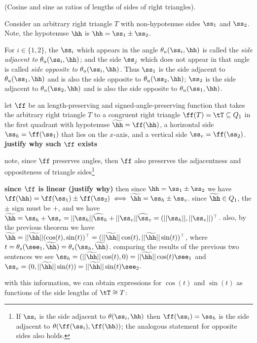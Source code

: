 \begin{deriv}
	(Cosine and sine as ratios of lengths of sides of right triangles).
	
	\newcommand{\thh}{\widetilde{\hh}}
	
	Consider an arbitrary right triangle $T$ with non-hypotenuse sides $\ss_1$ and $\ss_2$. Note, the hypotenuse $\hh$ is $\hh = \ss_1 \pm \ss_2$.
	
	For $i \in \{1, 2\}$, the $\ss_i$ which appears in the angle $\theta_u(\ss_i, \hh)$ is called the \textit{side adjacent to $\theta_u(\ss_i, \hh)$}; and the side $\ss_j$ which does not appear in that angle is called \textit{side opposite to $\theta_u(\ss_i, \hh)$}. Thus $\ss_1$ is the side adjacent to $\theta_u(\ss_1, \hh)$ and is also the side opposite to $\theta_u(\ss_2, \hh)$; $\ss_2$ is the side adjacent to $\theta_u(\ss_2, \hh)$ and is also the side opposite to $\theta_u(\ss_1, \hh)$.
	
	let $\ff$ be an length-preserving and signed-angle-preserving function that takes the arbitrary right triangle $T$ to a congruent right triangle $\ff(T) = \tT \subseteq Q_1$ in the first quadrant with hypotenuse $\thh = \ff(\hh)$, a horizontal side $\ss_h = \ff(\ss_1)$ that lies on the $x$-axis, and a vertical side $\ss_v = \ff(\ss_2)$. \textbf{justify why such $\ff$ exists}
	
	note, since $\ff$ preserves angles, then $\ff$ also preserves the adjacentness and oppositeness of triangle sides\footnote{If $\ss_i$ is the side adjacent to $\theta(\ss_i, \hh)$ then $\ff(\ss_i) = \ss_h$ is the side adjacent to $\theta(\ff(\ss_i), \ff(\hh))$; the analogous statement for opposite sides also holds.}
	
	\textbf{since $\ff$ is linear (justify why)} then since $\hh = \ss_1 \pm \ss_2$ we have $\ff(\hh) = \ff(\ss_1) \pm \ff(\ss_2) \iff \thh = \ss_h \pm \ss_v$. since $\thh \in Q_1$, the $\pm$ sign must be $+$, and we have $\thh = \ss_h + \ss_v = ||\ss_h||\widehat{\ss}_h + ||\ss_v|| \widehat{\ss}_v = (||\ss_h||, ||\ss_v||)^\top$. also, by the previous theorem we have $\thh = ||\thh||(\cos(t), \sin(t))^\top = (||\thh||\cos(t), ||\thh||\sin(t))^\top$, where $t = \theta_s(\see_1, \thh) = \theta_s(\ss_h, \thh)$. comparing the results of the previous two sentences we see $\ss_h = (||\thh||\cos(t), 0) = ||\thh||\cos(t)\see_1$ and $\ss_v = (0, ||\thh||\sin(t)) = ||\thh||\sin(t)\see_2$.
	
	with this information, we can obtain expressions for $\cos(t)$ and $\sin(t)$ as functions of the side lengths of $\tT \cong T$:
	

\end{deriv}
